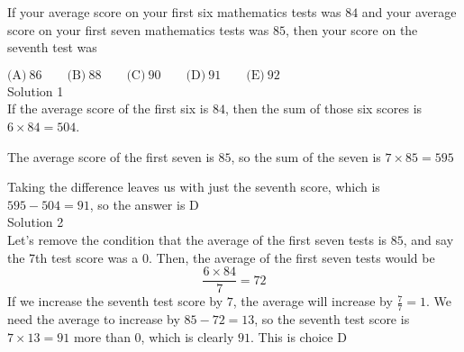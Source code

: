 

If your average score on your first six mathematics tests was $84$ and your average score on your first seven mathematics tests was $85$, then your score on the seventh test was

$\text{(A)}\ 86 \qquad \text{(B)}\ 88 \qquad \text{(C)}\ 90 \qquad \text{(D)}\ 91 \qquad \text{(E)}\ 92$
\\
Solution 1
\\
If the average score of the first six is $84$, then the sum of those six scores is $6\times 84=504$.

The average score of the first seven is $85$, so the sum of the seven is $7\times 85=595$

Taking the difference leaves us with just the seventh score, which is $595-504=91$, so the answer is $\boxed{\text{D}}$
\\
Solution 2
\\
Let's remove the condition that the average of the first seven tests is $85$, and say the 7th test score was a $0$. Then, the average of the first seven tests would be \[\frac{6\times 84}{7}=72\]
If we increase the seventh test score by $7$, the average will increase by $\frac{7}{7}=1$. We need the average to increase by $85-72=13$, so the seventh test score is $7\times 13=91$ more than $0$, which is clearly $91$. This is choice $\boxed{\text{D}}$
